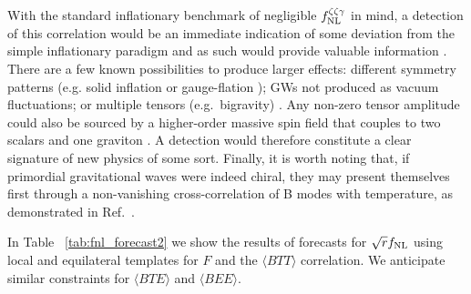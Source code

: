 %

With the standard inflationary benchmark of negligible $f^{\zeta \zeta\gamma }_{\rm NL}$ in mind, a detection of this correlation would be an immediate indication of some deviation from the simple inflationary paradigm and as such would provide valuable information \cite{Bordin:2016ruc,Dimastrogiovanni:2015pla}. There are a few known possibilities to produce larger effects: different symmetry patterns (e.g. solid inflation \cite{Endlich:2012pz} or gauge-flation \cite{Maleknejad:2011jw}); GWs not produced as vacuum fluctuations; or multiple tensors (e.g.\ bigravity) \cite{Bordin:2016ruc}. Any non-zero tensor amplitude could also be sourced by a higher-order massive spin field that couples to two scalars and one graviton \cite{Dimastrogiovanni:2015pla}. A detection would therefore constitute a clear signature of new physics of some sort. Finally, it is worth noting that, if primordial gravitational waves were indeed chiral, they may present themselves first through a non-vanishing cross-correlation of B modes with temperature, as demonstrated in Ref.~\cite{Contaldi:2008yz}.

In Table ~\ref{tab:fnl_forecast2} we show the results of forecasts for $\sqrt{r}f_{\rm NL}$ using local and equilateral templates for $F$ and the $\langle BTT\rangle$ correlation. We anticipate similar constraints for $\langle BTE\rangle $ and $\langle BEE\rangle$. 

